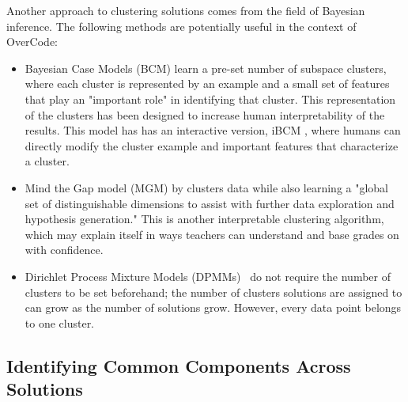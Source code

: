 Another approach to clustering solutions comes from the field of Bayesian inference. The following methods are potentially useful in the context of OverCode:
\begin{itemize}
\item Bayesian Case Models (BCM) \citet{beenNIPS} learn a pre-set number of subspace clusters, where each cluster is represented by an example and a small set of features that play an "important role" in identifying that cluster. This representation of the clusters has been designed to increase human interpretability of the results. This model has has an interactive version, iBCM \cite{beenthesis}, where humans can directly modify the cluster example and important features that characterize a cluster.
\item Mind the Gap model (MGM) by \citet{kim2015mind} clusters data while also learning a "global set of distinguishable dimensions to assist with further data exploration and hypothesis generation." This is another interpretable clustering algorithm, which may explain itself in ways teachers can understand and base grades on with confidence.
\item Dirichlet Process Mixture Models (DPMMs)~\cite{} do not require the number of clusters to be set beforehand; the number of clusters solutions are assigned to can grow as the number of solutions grow. However, every data point belongs to one cluster.
\end{itemize}







\subsection{Identifying Common Components Across Solutions}

